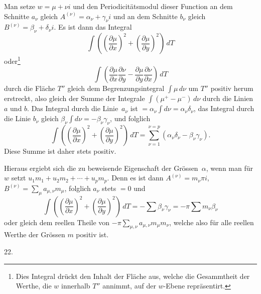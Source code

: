 \documentclass[a4paper,12pt,leqno]{article}
\begin{document}
Man setze $w = \mu + \nu i$ und den Periodicit\"{a}tsmodul dieser
Function an dem Schnitte $a_\nu$ gleich
$A^{(\nu)} = \alpha_\nu + \gamma_\nu i$
und an dem Schnitte $b_\nu$ gleich
$B^{(\nu)} = \beta_\nu + \delta_\nu i$.
Es ist dann das Integral
\[ \int  \left(
            \left( \frac{\partial \mu}{\partial x} \right)^2
          + \left( \frac{\partial \mu}{\partial y} \right)^2
         \right) \, dT \]
oder\footnote{Dies Integral dr\"{u}ckt den Inhalt der Fl\"{a}che
aus, welche die Gesammtheit der Werthe, die $w$ innerhalb $T''$
annimmt, auf der $w$-Ebene repr\"{a}sentirt.}
\[ \int  \left(
            \frac{\partial \mu}{\partial x}
            \frac{\partial \nu}{\partial y}
          - \frac{\partial \mu}{\partial y}
            \frac{\partial \nu}{\partial x}
         \right) \, dT \]
durch die Fl\"{a}che $T''$ gleich dem Begrenzungsintegral
$\int \mu \, d\nu$ um $T''$ positiv herum erstreckt, also gleich
der Summe der Integrale $\int ( \mu^+ - \mu^- ) \, d\nu$ durch
die Linien $a$ und $b$.  Das Integral durch die Linie~$a_\nu$ ist
$= \alpha_\nu \int d\nu = \alpha_\nu \delta_\nu$,
das Integral durch die Linie $b_\nu$ gleich
$\beta_\nu \int d\nu = - \beta_\nu \gamma_\nu$,
und folglich
\[ \int  \left(
            \left( \frac{\partial \mu}{\partial x} \right)^2
          + \left( \frac{\partial \mu}{\partial y} \right)^2
         \right) \, dT
   = \sum_{\nu = 1}^{\nu = p}
         (\alpha_\nu \delta_\nu - \beta_\nu \gamma_\nu).\]
Diese Summe ist daher stets positiv.

Hieraus ergiebt sich die zu beweisende Eigenschaft der
Gr\"{o}ssen~$\alpha$, wenn man f\"{u}r $w$ setzt
$u_1 m_1 + u_2 m_2 + \cdots + u_p m_p$.
Denn es ist dann
$A^{(\nu)} = m_\nu \pi i$,
$B^{(\nu)} = \sum\limits_\mu a_{\mu , \nu} m_\mu$,
folglich $a_\nu$ stets $= 0$ und
\[ \int  \left(
            \left( \frac{\partial \mu}{\partial x} \right)^2
          + \left( \frac{\partial \mu}{\partial y} \right)^2
         \right) \, dT
   = - \sum \beta_\nu \gamma_\nu = - \pi \sum m_\nu \beta_\nu \]
oder gleich dem reellen Theile von
$-\pi \sum\limits_{\mu, \nu} a_{\mu, \nu} m_\mu m_\nu$,
welche also f\"{u}r alle reellen Werthe der Gr\"{o}ssen $m$
positiv ist.

\medbreak

\centerline{22.}

\nobreak\medskip
\end{document}

